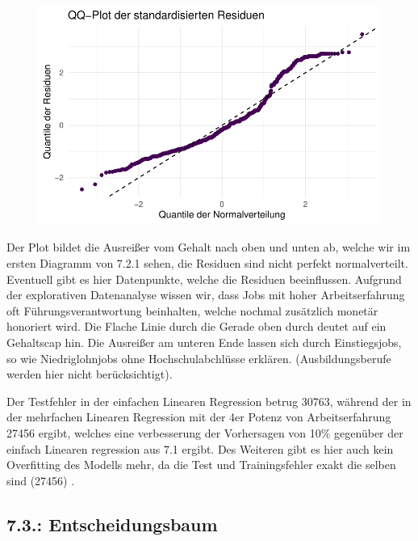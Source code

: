 \documentclass[
  letterpaper,
  DIV=11,
  numbers=noendperiod]{scrartcl}
\begin{document}
\begin{figure}[H]

{\centering \includegraphics{main_doc_files/figure-pdf/unnamed-chunk-161-1.pdf}

}

\end{figure}

Der Plot bildet die Ausreißer vom Gehalt nach oben und unten ab, welche
wir im ersten Diagramm von 7.2.1 sehen, die Residuen sind nicht perfekt
normalverteilt. Eventuell gibt es hier Datenpunkte, welche die Residuen
beeinflussen. Aufgrund der explorativen Datenanalyse wissen wir, dass
Jobs mit hoher Arbeitserfahrung oft Führungsverantwortung beinhalten,
welche nochmal zusätzlich monetär honoriert wird. Die Flache Linie durch
die Gerade oben durch deutet auf ein Gehaltscap hin. Die Ausreißer am
unteren Ende lassen sich durch Einstiegsjobs, so wie Niedriglohnjobs
ohne Hochschulabchlüsse erklären. (Ausbildungsberufe werden hier nicht
berücksichtigt).

Der Testfehler in der einfachen Linearen Regression betrug 30763,
während der in der mehrfachen Linearen Regression mit der 4er Potenz von
Arbeitserfahrung 27456 ergibt, welches eine verbesserung der Vorhersagen
von 10\% gegenüber der einfach Linearen regression aus 7.1 ergibt. Des
Weiteren gibt es hier auch kein Overfitting des Modells mehr, da die
Test und Trainingsfehler exakt die selben sind (27456) .

\hypertarget{entscheidungsbaum}{%
\subsection{7.3.: Entscheidungsbaum}\label{entscheidungsbaum}}
\end{document}
